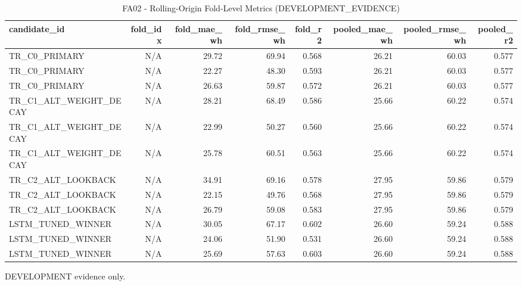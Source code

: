 \begin{table}[h!]
\centering
\caption{FA02 - Rolling-Origin Fold-Level Metrics (DEVELOPMENT\_EVIDENCE)}
\label{tab:fa02\_-\_rolling-origin\_fold-level\_metrics\_(development\_evidence)}
\begin{tabular}{lrrrrrrr}
\toprule
candidate\_id & fold\_idx & fold\_mae\_wh & fold\_rmse\_wh & fold\_r2 & pooled\_mae\_wh & pooled\_rmse\_wh & pooled\_r2 \\
\midrule
TR\_C0\_PRIMARY & N/A & 29.72 & 69.94 & 0.568 & 26.21 & 60.03 & 0.577 \\
TR\_C0\_PRIMARY & N/A & 22.27 & 48.30 & 0.593 & 26.21 & 60.03 & 0.577 \\
TR\_C0\_PRIMARY & N/A & 26.63 & 59.87 & 0.572 & 26.21 & 60.03 & 0.577 \\
TR\_C1\_ALT\_WEIGHT\_DECAY & N/A & 28.21 & 68.49 & 0.586 & 25.66 & 60.22 & 0.574 \\
TR\_C1\_ALT\_WEIGHT\_DECAY & N/A & 22.99 & 50.27 & 0.560 & 25.66 & 60.22 & 0.574 \\
TR\_C1\_ALT\_WEIGHT\_DECAY & N/A & 25.78 & 60.51 & 0.563 & 25.66 & 60.22 & 0.574 \\
TR\_C2\_ALT\_LOOKBACK & N/A & 34.91 & 69.16 & 0.578 & 27.95 & 59.86 & 0.579 \\
TR\_C2\_ALT\_LOOKBACK & N/A & 22.15 & 49.76 & 0.568 & 27.95 & 59.86 & 0.579 \\
TR\_C2\_ALT\_LOOKBACK & N/A & 26.79 & 59.08 & 0.583 & 27.95 & 59.86 & 0.579 \\
LSTM\_TUNED\_WINNER & N/A & 30.05 & 67.17 & 0.602 & 26.60 & 59.24 & 0.588 \\
LSTM\_TUNED\_WINNER & N/A & 24.06 & 51.90 & 0.531 & 26.60 & 59.24 & 0.588 \\
LSTM\_TUNED\_WINNER & N/A & 25.69 & 57.63 & 0.603 & 26.60 & 59.24 & 0.588 \\
\bottomrule
\end{tabular}
\vspace{4pt}
\footnotesize{DEVELOPMENT evidence only.}\\
\end{table}
